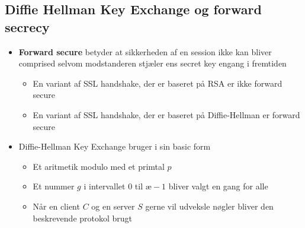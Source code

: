 \documentclass[a4, english]{article}
\begin{document}
\subsection{Diffie Hellman Key Exchange og forward secrecy}
\begin{itemize}
	\item \textbf{Forward secure} betyder at sikkerheden af en session ikke kan bliver comprised selvom modstanderen stjæler ens secret key engang i fremtiden  
  \begin{itemize}
  	\item En variant af SSL handshake, der er baseret på RSA er ikke forward secure
    \item En variant af SSL handshake, der er baseret på Diffie-Hellman er forward secure
  \end{itemize}
  \item Diffie-Hellman Key Exchange bruger i sin basic form 
  \begin{itemize}
  	\item Et aritmetik modulo med et primtal $p$ 
    \item Et nummer $g$ i intervallet $0$ til $æ-1$ bliver valgt en gang for alle
    \item Når en client $C$ og en server $S$ gerne vil udveksle nøgler bliver den beskrevende protokol brugt 
  \end{itemize}
\end{itemize}
\end{document}
